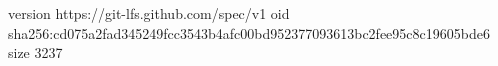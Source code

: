 version https://git-lfs.github.com/spec/v1
oid sha256:cd075a2fad345249fcc3543b4afc00bd952377093613bc2fee95c8c19605bde6
size 3237
